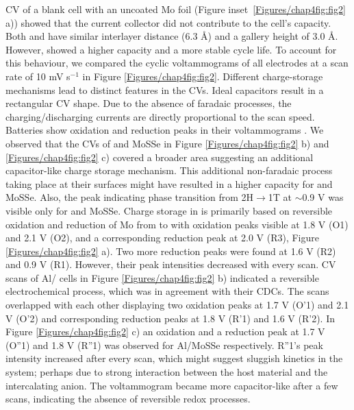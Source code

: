CV of a blank cell with an uncoated Mo foil (Figure inset\ \ref{Figures/chap4fig:fig2} a)) showed that the current collector did not contribute to the cell's capacity. Both  and  have similar interlayer distance (6.3 \AA) and a gallery height of 3.0 \AA. However,  showed a higher capacity and a more stable cycle life. To account for this behaviour, we compared the cyclic voltammograms of all electrodes at a scan rate of 10 mV s$^{-1}$ in Figure \ref{Figures/chap4fig:fig2}.  Different charge-storage mechanisms lead to distinct features in the CVs. Ideal capacitors result in a rectangular CV shape. Due to the absence of faradaic processes, the charging/discharging currents are directly proportional to the scan speed. Batteries show oxidation and reduction peaks in their voltammograms \cite{jiao_aluminum-ion_2016}. We observed that the CVs of  and MoSSe in Figure \ref{Figures/chap4fig:fig2} b) and \ref{Figures/chap4fig:fig2} c) covered a broader area suggesting an additional capacitor-like charge storage mechanism. This additional non-faradaic process taking place at their surfaces might have resulted in a higher capacity for  and  MoSSe. Also, the peak indicating phase transition from 2H$\rightarrow$1T at $\sim$0.9 V was visible only for  and MoSSe. Charge storage in  is primarily based on reversible oxidation and reduction of Mo from  to  with oxidation peaks visible at 1.8 V (O1) and 2.1 V (O2), and a corresponding reduction peak at 2.0 V (R3), Figure \ref{Figures/chap4fig:fig2} a). Two more reduction peaks were found at 1.6 V (R2) and 0.9 V (R1). However, their peak intensities decreased with every scan. CV scans of Al/ cells in Figure \ref{Figures/chap4fig:fig2} b) indicated a reversible electrochemical process, which was in agreement with their CDCs. The scans overlapped with each other displaying two oxidation peaks at 1.7 V (O'1) and 2.1 V (O'2) and corresponding reduction peaks at 1.8 V (R'1) and 1.6 V (R'2). In Figure \ref{Figures/chap4fig:fig2} c) an oxidation and a reduction peak at 1.7 V (O''1) and 1.8 V (R''1) was observed for Al/MoSSe respectively. R''1's peak intensity increased after every scan, which might suggest sluggish kinetics in the system; perhaps due to strong interaction between the host material and the intercalating anion. The voltammogram became more capacitor-like after a few scans, indicating the absence of reversible redox processes.

